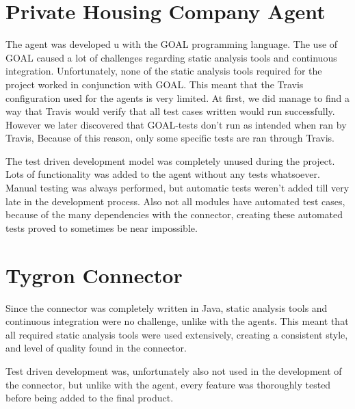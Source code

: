 \section{Private Housing Company Agent}
\label{sec:Private Housing Company Agent}

The agent was developed u with the GOAL programming language. The use of GOAL caused a lot of challenges regarding static analysis tools and continuous integration.
Unfortunately, none of the static analysis tools required for the project worked in conjunction with GOAL. This meant that the Travis configuration used for the agents is very limited.
At first, we did manage to find a way that Travis would verify that all test cases written would run successfully. However we later discovered that GOAL-tests don't run as intended when ran by Travis,
Because of this reason, only some specific tests are ran through Travis.

The test driven development model was completely unused during the project. Lots of functionality was added to the agent without any tests whatsoever. Manual testing was always performed, but automatic
tests weren't added till very late in the development process. Also not all modules have automated test cases, because of the many dependencies with the connector, creating these automated tests proved
to sometimes be near impossible.

\section{Tygron Connector}
\label{sec:Tygron Connector}

Since the connector was completely written in Java, static analysis tools and continuous integration were no challenge, unlike with the agents. This meant that all required static analysis tools were
used extensively, creating a consistent style, and level of quality found in the connector.

Test driven development was, unfortunately also not used in the development of the connector, but unlike with the agent, every feature was thoroughly tested before being added to the final product.
